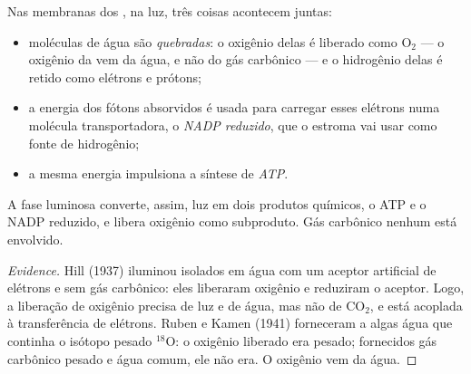 \begin{proposition}\label{prop:g12:photosynthesis:lightphase}
Nas membranas dos , na luz, três coisas acontecem juntas:
\begin{itemize}
  \item moléculas de água são \emph{quebradas}: o oxigênio delas é
        liberado como $\mathrm{O_2}$ --- o oxigênio da  vem
        da água, e não do gás carbônico --- e o hidrogênio delas é
        retido como elétrons e prótons;
  \item a energia dos fótons absorvidos é usada para carregar esses
        elétrons numa molécula transportadora, o \emph{NADP reduzido},
        que o estroma vai usar como fonte de hidrogênio;
  \item a mesma energia impulsiona a síntese de \emph{ATP}.
\end{itemize}
A fase luminosa converte, assim, luz em dois produtos químicos, o ATP e
o NADP reduzido, e libera oxigênio como subproduto. Gás carbônico
nenhum está envolvido.
\end{proposition}
\begin{proof}[Evidence]
Hill (1937) iluminou  isolados em água com um aceptor
artificial de elétrons e sem gás carbônico: eles liberaram oxigênio e
reduziram o aceptor. Logo, a liberação de oxigênio precisa de luz e de
água, mas não de $\mathrm{CO_2}$, e está acoplada à transferência de
elétrons. Ruben e Kamen (1941) forneceram a algas água que continha o
isótopo pesado $^{18}$O: o oxigênio liberado era pesado; fornecidos gás
carbônico pesado e água comum, ele não era. O oxigênio vem da água.
\end{proof}

